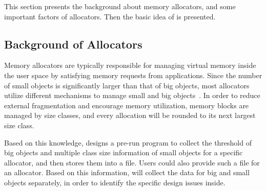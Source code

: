This section presents the background about memory allocators, and some important factors of allocators. Then the basic idea of \MP{} is presented. 

\subsection{Background of Allocators}

\label{sec:allocator}
Memory allocators are typically responsible for managing virtual memory inside the user space by satisfying memory requests from applications. Since the number of small objects is significantly larger than that of big objects, most allocators utilize different mechanisms to manage small and big objects~\cite{Hoard}. In order to reduce external fragmentation and encourage memory utilization, memory blocks are managed by size classes, and every allocation will be rounded to its next largest size class.  

Based on this knowledge, \MP{} designs a pre-run program to collect the threshold of big objects and multiple class size information of small objects for a specific allocator, and then stores them into a file. Users could also provide such a file for an allocator. Based on this information, \MP{} will collect the data for big and small objects separately, in order to identify the specific design issues inside. 
 


